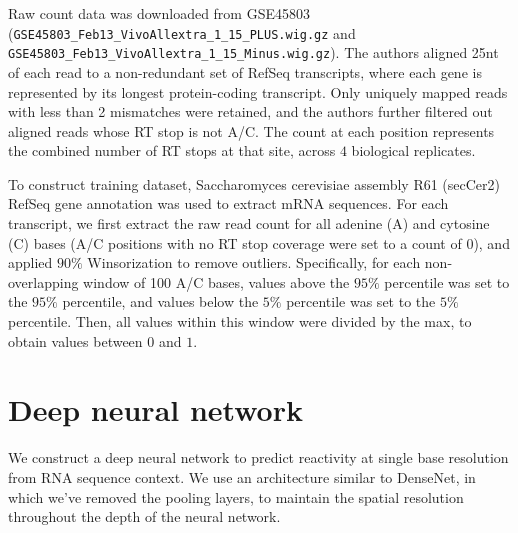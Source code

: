 \documentclass{proposal}
\begin{document}
Raw count data was downloaded from GSE45803 (\verb|GSE45803_Feb13_VivoAllextra_1_15_PLUS.wig.gz| and \verb|GSE45803_Feb13_VivoAllextra_1_15_Minus.wig.gz|).
The authors aligned 25nt of each read to a non-redundant set of RefSeq transcripts,
where each gene is represented by its longest protein-coding transcript.
Only uniquely mapped reads with less than 2 mismatches were retained,
and the authors further filtered out aligned reads whose RT stop is not A/C.
The count at each position represents the combined number of RT stops at that site, across $4$ biological replicates.

To construct training dataset, Saccharomyces cerevisiae assembly R61 (secCer2) RefSeq gene annotation was used to extract mRNA sequences.
For each transcript, we first extract the raw read count for all adenine (A) and cytosine (C) bases
(A/C positions with no RT stop coverage were set to a count of $0$),
and applied ﻿$90\%$ Winsorization to remove outliers.
Specifically, for each non-overlapping window of 100 A/C bases, values above the $95\%$ percentile was set to the $95\%$ percentile,
and values below the $5\%$ percentile was set to the $5\%$ percentile.
Then, all values within this window were divided by the max, to obtain values between $0$ and $1$.





\section{Deep neural network}


We construct a deep neural network to predict reactivity at single base resolution from RNA sequence context.
We use an architecture similar to DenseNet\cite{huang2017densely},
in which we've removed the pooling layers, to maintain the spatial resolution throughout the depth of the neural network.
\end{document}
